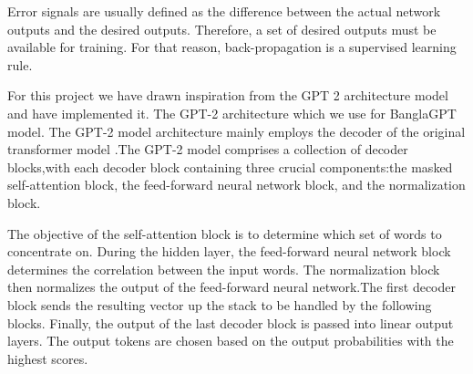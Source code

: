 Error signals are usually defined as the difference between the actual network outputs and the desired outputs. Therefore, a set of desired outputs must be available for training. For that reason, back-propagation is a supervised learning rule.

For this project we have drawn inspiration from the GPT 2 architecture model \cite{BanglaGPT:1} and have implemented it. The GPT-2 architecture which we use for BanglaGPT model. The GPT-2 model architecture mainly employs the decoder of the original transformer model .The GPT-2 model comprises a collection of decoder blocks,with each decoder block containing three crucial components:the masked self-attention block, the feed-forward neural network block, and the normalization block.

The objective of the self-attention block is to determine which set of words to concentrate on. During the hidden layer, the feed-forward neural network block determines the correlation between the input words. The normalization block then normalizes the output of the feed-forward neural network.The first decoder block sends the resulting vector up the stack to be handled by the following blocks. Finally, the output of the last decoder block is passed into linear output layers. The output tokens are chosen based on the output probabilities with the highest scores.
